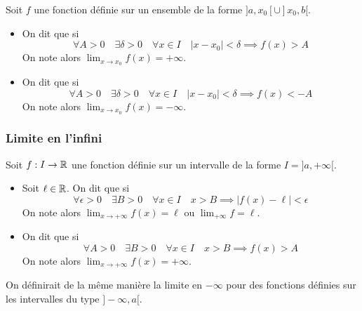 \documentclass[class=report,crop=false]{standalone}
\begin{document}
Soit $f$ une fonction définie sur un ensemble de la forme $]a,x_0[\cup ]x_0,b[$.
\begin{definition}
\sauteligne
\begin{itemize}
  \item  On dit que  si
\[
\forall A>0 \quad \exists \delta>0 \quad \forall x\in I \quad \vert x-x_0\vert <\delta \implies f(x)>A
\]
On note alors $\displaystyle\lim_{x\to x_0}f(x)=+\infty$.

  \item On dit que  si
\[
\forall A>0 \quad \exists \delta>0 \quad \forall x\in I \quad \vert x-x_0\vert <\delta \implies f(x)<-A
\]
On note alors $\displaystyle\lim_{x\to x_0}f(x)=-\infty$.
\end{itemize}
\end{definition}


\subsubsection{Limite en l'infini}

Soit $f:I\to \mathbb{R}$ une fonction définie sur un intervalle de la forme $I=]a,+\infty[$.

\begin{definition}
\sauteligne
\begin{itemize}
  \item Soit $\ell\in\mathbb{R}$. On dit que  si
\[
\forall \epsilon>0 \quad \exists B>0 \quad \forall x\in I \quad x>B \implies \vert f(x)-\ell\vert <\epsilon
\]
On note alors $\displaystyle\lim_{x\to +\infty}f(x)=\ell$ ou $\displaystyle\lim_{+\infty} f=\ell$.
  \item On dit que  si
\[
\forall A>0 \quad \exists B>0 \quad \forall x\in I \quad x>B \implies  f(x)>A
\]
On note alors $\displaystyle\lim_{x\to +\infty}f(x)=+\infty$.
\end{itemize}
\end{definition}

On définirait de la même manière la limite en $-\infty$ pour des fonctions définies sur
les intervalles du type $]-\infty,a[$.


\end{document}
